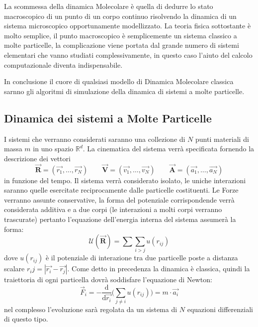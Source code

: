 \documentclass[11pt]{article}
\theoremstyle{plain}
\theoremstyle{remark}
\begin{document}
La scommessa della dinamica Molecolare è quella di dedurre lo stato macroscopico di un punto di un corpo continuo risolvendo la dinamica di un sistema microscopico opportunamente modellizzato.
La teoria fisica sottostante è molto semplice, il punto macroscopico è semplicemente un sistema classico  a molte particelle, la complicazione viene portata dal grande numero di sistemi elementari che vanno studiati complessivamente, in questo caso l'aiuto del calcolo computazionale diventa indispensabile. 

In conclusione il cuore di qualsiasi modello di Dinamica Molecolare classica sarnno gli algoritmi di simulazione della dinamica di sistemi a molte particelle.

\subsection{Dinamica dei sistemi a Molte Particelle}
I sistemi che verranno considerati saranno una collezione di $N$ punti materiali di massa $m$ in uno spazio $\mathbb{R}^d$.
La cinematica del sistema verrà specificata fornendo la descrizione dei vettori
\begin{displaymath}
\vec{\mathbf{R}}=(\vec{r_1},\ldots,\vec{r_N}) \qquad \vec{\mathbf{V}}=(\vec{v_1},\ldots,\vec{v_N}) \qquad \vec{\mathbf{A}}=(\vec{a_1},\ldots,\vec{a_N}) 
\end{displaymath}
in funzione del tempo.\newline
Il sistema verrà considerato isolato, le uniche interazioni saranno quelle esercitate reciprocamente dalle particelle costituenti. Le Forze verranno assunte conservative, la forma del potenziale corrispondende verrà considerata additiva e a due corpi (le interazioni a molti corpi verranno trascurate) pertanto l'equazione dell'energia interna del sistema assumerà la forma:
\begin{displaymath}
\mathcal{U}(\vec{\mathbf{R}}) = \sum\sum_{i>j}u(r_{ij})
\end{displaymath}
dove $u(r_{ij})$ è il potenziale di interazione tra due particelle poste a distanza scalare $r_ij = |\vec{r_i}-\vec{r_j}|$.
\newline
Come detto in precedenza la dinamica è classica, quindi la traiettoria di ogni particella dovrà soddisfare l'equazione di Newton:
\begin{displaymath}
\vec{F}_i = - \dfrac{\textrm{d}}{\textrm{d}\vec{r_i}} \Bigr(\sum_{j \neq i}u(r_{ij}) \Bigr) = m \cdot \vec{a_i}
\end{displaymath}
nel complesso l'evoluzione sarà regolata da un sistema di $N$ equazioni differenziali di questo tipo.
\end{document}
